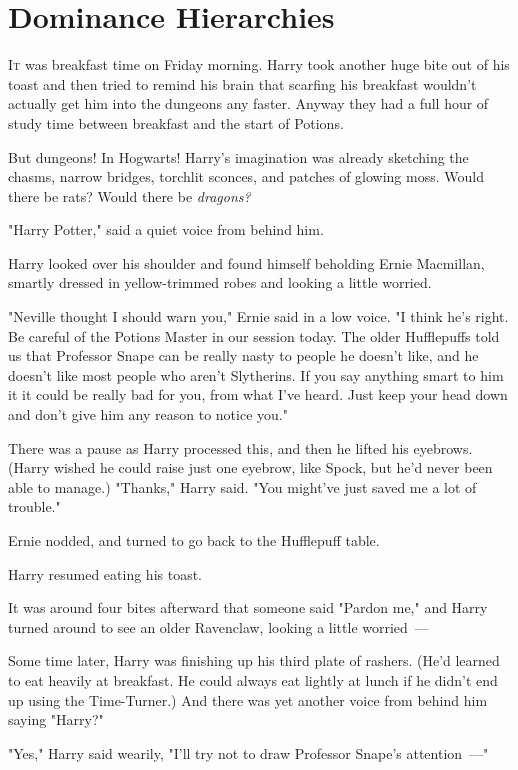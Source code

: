 \chapter{Dominance Hierarchies}

\lettrine{I}{t} was breakfast time on Friday morning. Harry took another huge bite out of
his toast and then tried to remind his brain that scarfing his breakfast
wouldn't actually get him into the dungeons any faster. Anyway they had a full
hour of study time between breakfast and the start of Potions.

But dungeons! In Hogwarts! Harry's imagination was already sketching the
chasms, narrow bridges, torchlit sconces, and patches of glowing moss. Would
there be rats? Would there be \emph{dragons?}

"Harry Potter," said a quiet voice from behind him.

Harry looked over his shoulder and found himself beholding Ernie Macmillan,
smartly dressed in yellow-trimmed robes and looking a little worried.

"Neville thought I should warn you," Ernie said in a low voice. "I think he's
right. Be careful of the Potions Master in our session today. The older
Hufflepuffs told us that Professor Snape can be really nasty to people he
doesn't like, and he doesn't like most people who aren't Slytherins. If you say
anything smart to him it{\el} it could be really bad for you, from what I've
heard. Just keep your head down and don't give him any reason to notice you."

There was a pause as Harry processed this, and then he lifted his eyebrows.
(Harry wished he could raise just one eyebrow, like Spock, but he'd never been
able to manage.) "Thanks," Harry said. "You might've just saved me a lot of
trouble."

Ernie nodded, and turned to go back to the Hufflepuff table.

Harry resumed eating his toast.

It was around four bites afterward that someone said "Pardon me," and Harry
turned around to see an older Ravenclaw, looking a little worried~---

Some time later, Harry was finishing up his third plate of rashers. (He'd
learned to eat heavily at breakfast. He could always eat lightly at lunch if he
didn't end up using the Time-Turner.) And there was yet another voice from
behind him saying "Harry?"

"Yes," Harry said wearily, "I'll try not to draw Professor Snape's attention~---"

